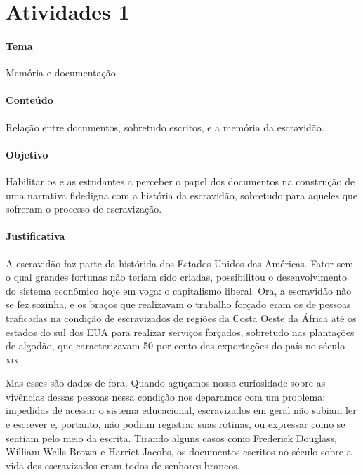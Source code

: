\documentclass[11pt]{extarticle}
\begin{document}
\tableofcontents

\section{Atividades 1}




\paragraph{Tema} Memória e documentação.

\paragraph{Conteúdo} Relação entre documentos, sobretudo escritos, e a memória da escravidão.

\paragraph{Objetivo} Habilitar os e as estudantes a perceber o papel dos documentos na 
construção de uma narrativa fidedigna com a história da escravidão, sobretudo para aqueles
que sofreram o processo de escravização.

\paragraph{Justificativa} A escravidão faz parte da histórida dos Estados Unidos das Américas.
Fator sem o qual grandes fortunas não teriam sido criadas, possibilitou o desenvolvimento
do sistema econômico hoje em voga: o capitalismo liberal. Ora, a escravidão não se fez sozinha, 
e os braços que realizavam o trabalho forçado eram os de pessoas traficadas na condição de escravizados
de regiões da Costa Oeste da África até os estados do sul dos EUA para realizar serviços forçados,
sobretudo nas plantações de algodão, que caracterizavam 50 por cento das exportações do país no século \textsc{xix}. 

Mas esses são dados de fora. Quando aguçamos nossa curiosidade sobre as vivências dessas pessoas
nessa  condição nos deparamos com um problema: impedidas de acessar o sistema educacional,
escravizados em geral não sabiam ler e escrever e, portanto, não podiam registrar suas rotinas,
ou expressar como se sentiam pelo meio da escrita. Tirando alguns casos como Frederick Douglass,
William Wells Brown e Harriet Jacobs, os documentos escritos no século  sobre a vida dos escravizados
eram todos de senhores brancos. 
\end{document}
